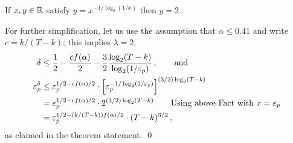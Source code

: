   \begin{fact*}
    If $x,y \in \mathbb{R}$ satisfy $y = x^{-1/\log_2(1/x)}$ then $y = 2$.
  \end{fact*}
  \noindent
  For further simplification, let us use the assumption that $\alpha \leq 0.41$ 
  and write $c = k/(T-k)$; 
  this implies $\lambda = 2$, 
  \begin{align*}
    \delta
      &\leq \frac{1}{2} - \frac{c f(\alpha)}{2} - \frac{3}{2} \frac{ \log_2(T - k)}{\log_2(1/\mathsf{\varepsilon}_p)}\,, 
      \qquad \text{and}\\
    \mathsf{\varepsilon}_p^\delta  
      &\leq \mathsf{\varepsilon}_p^{1/2 - c f(\alpha)/2} \cdot \left[ \mathsf{\varepsilon}_p^{-1/\log_2(1/\mathsf{\varepsilon}_p)} \right]^{(3/2)\log_2(T - k)} \\
      &= \mathsf{\varepsilon}_p^{1/2 - c f(\alpha)/2} \cdot 2^{(3/2)\log_2(T - k)} \qquad\text{Using above Fact with $x = \mathsf{\varepsilon}_p$}\\
      &= \mathsf{\varepsilon}_p^{1/2 - (k/(T-k)) f(\alpha)/2} \cdot (T - k)^{3/2} 
      \,,
  \end{align*}
  as claimed in the theorem statement. 
\hfill\qed
